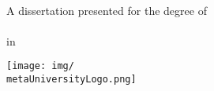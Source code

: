 
\begin{titlepage}
    \begin{center}
        \LARGE
        \textbf{\metaTitle}
        
        \vspace{1.5cm}
        
        \Large
        \textbf{\metaAuthor}
        \vspace{0.25cm}
        \\\metaAuthorIDNum
        
        \vfill
            
        \large
        A dissertation presented for the degree of\\
        \metaDegree
        \\in\\
        \metaSubject
            
        \vspace{1cm}
        
        \ifUniLogoSVG
            
        \else 
            \texttt{[image: img/\\metaUniversityLogo.png]}
        \fi
        \vspace{1cm}
            
        \begin{minipage}{0.4\textwidth}
            \begin{flushleft}
                \large
			    \textit{\metaSupervisorTitle}\\
			    \metaSupervisor
		    \end{flushleft}
	    \end{minipage}
	    ~
	    \begin{minipage}{0.4\textwidth}
	        	\begin{flushright}
			    \large
			    \textit{\metaSecondSupervisorTitle}\\
			    \metaSecondSupervisor
		    \end{flushright}
	    \end{minipage}            
            
        \vspace{1cm}            
            
        \large
        \metaFaculty\\
        \metaUniversity\\
        
        \vspace{0.5cm}
        
        \metaDate
            
    \end{center}
\end{titlepage}
